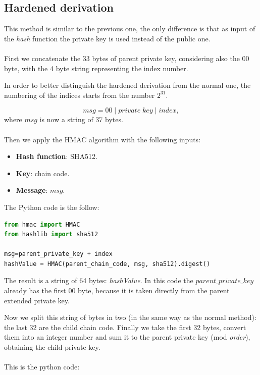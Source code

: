 \subsection{Hardened derivation}
This method is similar to the previous one, the only difference is that as input of the \textit{hash} function the private key is used instead of the public one. \\ \\
First we concatenate the 33 bytes of parent private key, considering also the $00$ byte, with the 4 byte string representing the index number.

\begin{remark}
In order to better distinguish the hardened derivation from the normal one, the numbering of the indices starts from the number $2^{31}.$
\end{remark} 
\begin{equation*}
msg = 00 \;|\; private\;key \;|\; index,
\end{equation*}
where $msg$ is now a string of $37$ bytes. \\ \\
Then we apply the HMAC algorithm with the following inputs:

\begin{itemize}[label=$\odot$]
	\item \textbf{Hash function}: SHA512.
	\item \textbf{Key}: chain code.
	\item \textbf{Message}: $msg$.
\end{itemize}
The Python code is the follow:
\begin{lstlisting}[language=Python]
from hmac import HMAC
from hashlib import sha512

msg=parent_private_key + index
hashValue = HMAC(parent_chain_code, msg, sha512).digest()
\end{lstlisting}
\begin{flushleft}
	The result is a string of 64 bytes: \textit{hashValue}. In this code the $parent\_private\_key$ already has the first $00$ byte, because it is taken directly from the parent extended private key.
\end{flushleft}
Now we split this string of bytes in two (in the same way as the normal method): the last 32 are the child chain code. Finally we take the first 32 bytes, convert them into an integer number and sum it to the parent private key (mod \textit{order}), obtaining the child private key.\\ \\
This is the python code:


